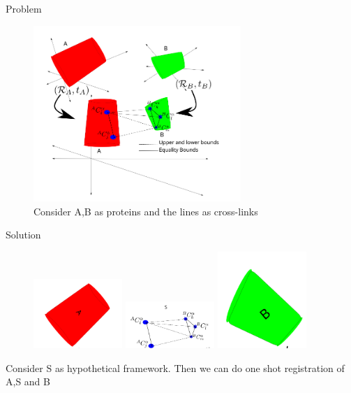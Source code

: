 \begin{frame}{Problem}
    \begin{figure}
        \centering
        \includegraphics[width=0.7\textwidth]{images/toy1.png}
        \caption{Consider A,B as proteins and the lines as cross-links}
        \label{fig:my_label}
    \end{figure}
\end{frame}

\begin{frame}{Solution}
    \begin{figure}
        \centering
        \includegraphics[width=0.3\textwidth]{images/A.png}
        \includegraphics[width=0.3\textwidth]{images/S.png}
        \includegraphics[width=0.3\textwidth]{images/B.png}
        \label{fig:my_label}
    \end{figure}
    Consider S as hypothetical framework. 
    \pause
    Then we can do one shot registration of A,S and B
\end{frame}

